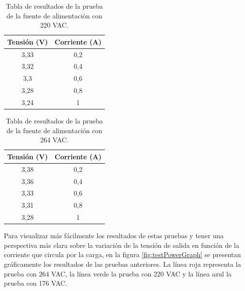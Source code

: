 \begin{table}[h]
	\centering
	\caption[Prueba de la fuente de alimentación 220 VAC]{Tabla de resultados de la prueba de la fuente de alimentación con 220 VAC.}
	\begin{tabular}{c c}    
		\toprule
		\textbf{Tensión (V)} & \textbf{Corriente (A)} \\
		\midrule
		3,33 & 0,2 \\		
		3,32 & 0,4 \\		
		3,3 & 0,6 \\
		3,28 & 0,8 \\
		3,24 & 1 \\
		\bottomrule
		\hline
	\end{tabular}
	\label{tab:testPower220}
\end{table}

\begin{table}[h]
	\centering
	\caption[Prueba de la fuente de alimentación 264 VAC]{Tabla de resultados de la prueba de la fuente de alimentación con 264 VAC.}
	\begin{tabular}{c c}    
		\toprule
		\textbf{Tensión (V)} & \textbf{Corriente (A)} \\
		\midrule
		3,38 & 0,2 \\		
		3,36 & 0,4 \\		
		3,33 & 0,6 \\
		3,31 & 0,8 \\
		3,28 & 1 \\
		\bottomrule
		\hline
	\end{tabular}
	\label{tab:testPower264}
\end{table}

Para visualizar más fácilmente los resultados de estas pruebas y tener una perspectiva más clara sobre la variación de la tensión de salida en función de la corriente que circula por la carga, en la figura \ref{fig:testPowerGraph} se presentan gráficamente los resultados de las pruebas anteriores. La línea roja representa la prueba con 264 VAC, la línea verde la prueba con 220 VAC y la línea azul la prueba con 176 VAC.

